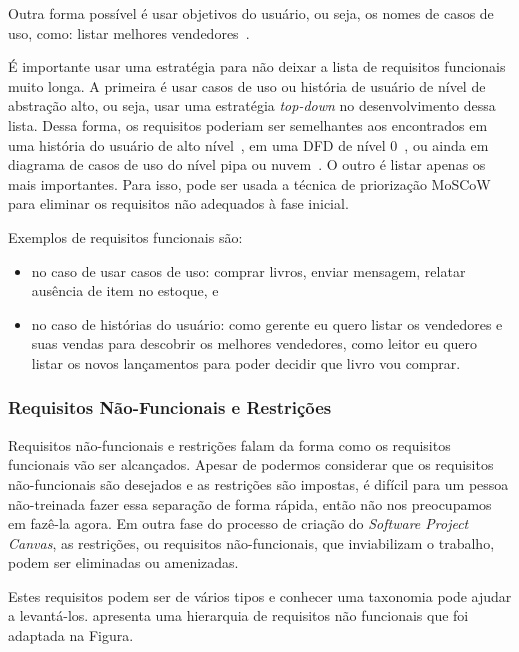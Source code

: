 \documentclass[a4]{report}
\begin{document}
Outra forma possível é usar objetivos do usuário, ou seja, os nomes de casos de uso, como: listar melhores vendedores~\citep{Cockburn2000}.

É importante usar uma estratégia para não deixar a lista de requisitos funcionais muito longa. A primeira é usar casos de uso ou história de usuário de nível de abstração alto, ou seja, usar uma estratégia \textit{top-down} no desenvolvimento dessa lista. Dessa forma, os requisitos poderiam ser semelhantes aos encontrados em uma história do usuário de alto nível~\citep{jacobson:2011:uc2p0}, em uma DFD de nível 0~\citep{gane:sarson:ssa}, ou ainda em diagrama de casos de uso do nível pipa ou nuvem~\citep{Cockburn2000}. O outro é listar apenas os mais importantes. Para isso, pode ser usada a técnica de priorização MoSCoW~\citep{babok,dsdm:2nd} para eliminar os requisitos não adequados à fase inicial.

Exemplos de requisitos funcionais são:
\begin{itemize}
    \item no caso de usar casos de uso: comprar livros, enviar mensagem, relatar ausência de item no estoque, e
    \item no caso de histórias do usuário: como gerente eu quero listar os vendedores e suas vendas para descobrir os melhores vendedores, como leitor eu quero listar os novos lançamentos para poder decidir que livro vou comprar.
\end{itemize}

\subsubsection{Requisitos Não-Funcionais e Restrições}

Requisitos não-funcionais e restrições falam da forma como os requisitos funcionais vão ser alcançados. Apesar de podermos considerar que os requisitos não-funcionais são desejados e as restrições são impostas, é difícil para um pessoa não-treinada fazer essa separação de forma rápida, então não nos preocupamos em fazê-la agora. Em outra fase do processo de criação do \textit{Software Project Canvas}, as restrições, ou requisitos não-funcionais, que inviabilizam o trabalho, podem ser eliminadas ou amenizadas.


Estes requisitos podem ser de vários tipos e conhecer uma taxonomia pode ajudar a levantá-los. \citet{sommerville:software:2015} apresenta uma hierarquia de requisitos não funcionais que foi adaptada na Figura.
\end{document}
